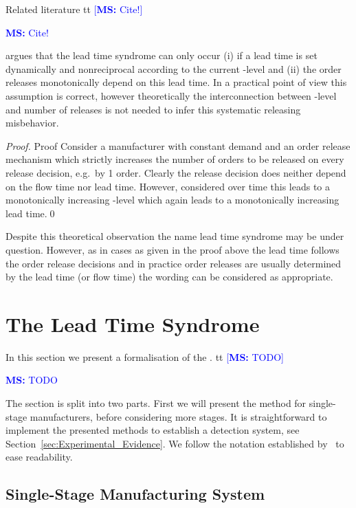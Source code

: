 \documentclass[mnsc]{informs3}
\newcommand\MS[2][r]{\ifx t#1 \textcolor{blue}{[\textbf{MS:} #2]}
  \else \begin{center}\textcolor{blue}{\textbf{MS:} #2} \end{center} \fi}
\begin{document}
Related literature \MS[t]{Cite!} argues that the lead time syndrome can only occur (i) if a lead
time is set dynamically and nonreciprocal according to the current \WIP{}-level and (ii) the order
releases monotonically depend on this lead time. In a practical point of view this assumption is
correct, however theoretically the interconnection between \WIP{}-level and number of releases is
not needed to infer this systematic releasing misbehavior.

\begin{proof}{Proof}
  Consider a manufacturer with constant demand and an order release mechanism which strictly
  increases the number of orders to be released on every release decision, e.g.~by 1 order. Clearly
  the release decision does neither depend on the flow time nor lead time. However, considered over
  time this leads to a monotonically increasing \WIP{}-level which again leads to a monotonically
  increasing lead time.\qed
\end{proof}

Despite this theoretical observation the name lead time syndrome may be under question. However, as
in cases as given in the proof above the lead time follows the order release decisions and in
practice order releases are usually determined by the lead time (or flow time) the wording can be
considered as appropriate.


\section{The Lead Time Syndrome}
\label{sec:The_Lead_Time_Syndrome}

In this section we present a formalisation of the \LTS{}.
%
\MS[t]{TODO} The section is split into two
parts. First we will present the method for single-stage manufacturers, before considering more
stages.
%
It is straightforward to implement the presented methods to establish a \LTS{} detection system, see
Section~\ref{sec:Experimental_Evidence}. We follow the notation established
by~\cite{selccuk2013adaptive} to ease readability.

\subsection{Single-Stage Manufacturing System}
\label{subsec:Single-Stage_Manufacturing_System}
\end{document}

